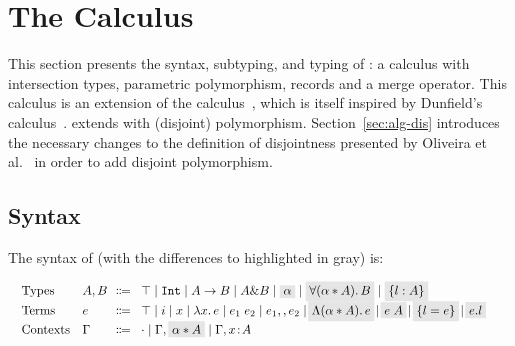 \section{The \name Calculus}\label{sec:fi}
This section presents the syntax, subtyping, and typing of \name: 
a calculus with intersection types, parametric polymorphism, records and a merge operator. 
This calculus is an extension of the \oldname calculus~\cite{oliveira16disjoint},
which is itself inspired by Dunfield's
calculus~\cite{dunfield2014elaborating}. \name extends \oldname with (disjoint) polymorphism.
Section~\ref{sec:alg-dis} introduces the necessary changes to the
definition of disjointness presented by Oliveira et al.~\cite{oliveira16disjoint} in
order to add disjoint polymorphism.


\subsection{Syntax}
The syntax of \name (with the differences to \oldname highlighted in gray) is: 

\vspace{-15pt}
  \[
    \begin{array}{l}
      \begin{array}{llrll}
        \text{Types}
        & A, B & \!\!\Coloneqq & \!\top \mid \tyint \mid A \to B \mid A
                             \inter B \mid \highlight{$\alpha$} \mid \highlight{$\fordis \alpha A B$} \mid \highlight{$\recordType l A$} & \\ 

        \text{Terms}
        & e & \!\!\Coloneqq & \!\top \mid i \mid x \mid \lamty x A e \mid \app {e_1} {e_2} 
              \mid e_1 \mergeop e_2 \mid \!\highlight{$\blamdis \alpha A e$} \!\mid \!\highlight{$\tapp e A$} \!\mid 
              \!\highlight{$\recordCon l e$} \!\mid \!\highlight{$\recordProj e l$} & \\
        \text{Contexts}
        & \Gamma & \!\!\Coloneqq & \!\cdot
                   \mid \Gamma, \highlight{$\alpha \disjoint A$}
                   \mid \Gamma, x \oftype A  & \\
      \end{array}
    \end{array}
  \]

